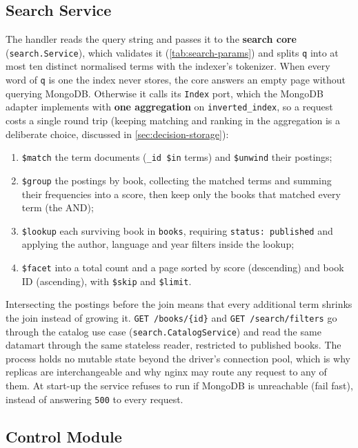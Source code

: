 \documentclass[10pt,a4paper]{article}
\newcommand{\code}[1]{\texttt{#1}}
\newcommand{\route}[1]{\texttt{#1}}
\begin{document}
\subsection{Search Service}
\label{sec:impl-search}

The handler reads the query string and passes it to the \textbf{search core}
(\code{search.Service}), which validates it (\cref{tab:search-params}) and
splits \code{q} into at most ten distinct normalised terms with the indexer's
tokenizer. When every word of \code{q} is one the index never stores, the core
answers an empty page without querying MongoDB. Otherwise it calls its
\code{Index} port, which the MongoDB adapter implements with \textbf{one
aggregation} on \code{inverted\_index}, so a request costs a single round trip
(keeping matching and ranking in the aggregation is a deliberate choice,
discussed in \cref{sec:decision-storage}):

\begin{enumerate}
  \item \code{\$match} the term documents (\code{\_id \$in} terms) and
  \code{\$unwind} their postings;
  \item \code{\$group} the postings by book, collecting the matched terms and
  summing their frequencies into a score, then keep only the books that
  matched every term (the AND);
  \item \code{\$lookup} each surviving book in \code{books}, requiring
  \code{status: published} and applying the author, language and year filters
  inside the lookup;
  \item \code{\$facet} into a total count and a page sorted by score
  (descending) and book ID (ascending), with \code{\$skip} and \code{\$limit}.
\end{enumerate}

Intersecting the postings before the join means that every additional term
shrinks the join instead of growing it. \route{GET /books/\{id\}} and
\route{GET /search/filters} go through the catalog use case
(\code{search.CatalogService}) and read the same datamart through the same
stateless reader, restricted to published books. The process holds no mutable state
beyond the driver's connection pool, which is why replicas are interchangeable
and why nginx may route any request to any of them. At start-up the service
refuses to run if MongoDB is unreachable (fail fast), instead of answering
\code{500} to every request.

\subsection{Control Module}
\label{sec:impl-control}
\end{document}
